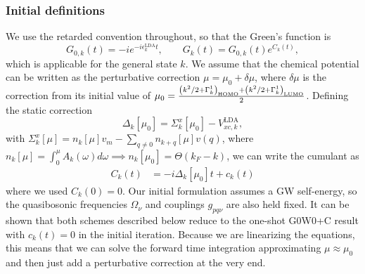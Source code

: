 \subsubsection{Initial definitions}
We use the retarded convention throughout, so that the Green's function is
\begin{equation}
    G_{0,k}(t)
    =
    -i e^{-i\epsilon_k^{\mathrm{LDA}}t},
    \qquad
    G_k(t)
    =
    G_{0,k}(t)e^{C_k(t)},
\end{equation}
which is applicable for the general state $k$. We assume that the chemical potential can be written as the perturbative correction $\mu = \mu_0 + \delta\mu$, where $\delta\mu$ is the correction from its initial value of $\mu_0=\frac{\left(k^2/2 + \Gamma^1_k\right)_{\rm HOMO}+\left(k^2/2 + \Gamma^1_k\right)_{\rm LUMO}}{2}$. Defining the
 static correction
\begin{equation}
    \Delta_k[\mu_0]
    =
    \Sigma_{k}^x[\mu_0]
    -
    V_{xc,k}^{\mathrm{LDA}},
\end{equation}
with $\Sigma_{k}^x[\mu]=n_{k}[\mu]v_m-\sum_{{q}\neq{0}} n_{{k}+{q}}[\mu]v({q})$, where $n_k[\mu]=\int_0^\mu A_k(\omega)d\omega\implies n_k[\mu_0]=\Theta(k_F-k)$,
we can write the cumulant as
\begin{align}
    C_k(t)
    &=
    -i\Delta_k[\mu_0] t+c_k(t)
\end{align}
where we used $C_k(0)=0$. Our initial formulation assumes a GW self-energy, so the quasibosonic frequencies $\Omega_\nu$ and couplings $g_{pq\nu}$ are also
held fixed. It can be shown that both schemes described below reduce to the one-shot G0W0+C result with $c_k(t)=0$ in the initial iteration. Because we are linearizing the equations, this means that we can solve the forward time integration approximating $\mu \approx \mu_0$ and then just add a perturbative correction at the very end. 
